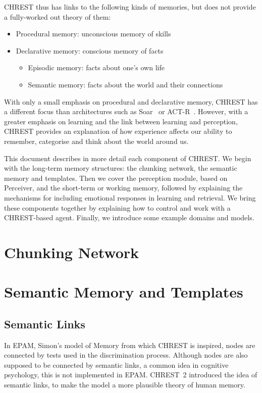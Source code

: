 \documentclass{article}
\begin{document}
CHREST thus has links to the following kinds of memories, but does not provide
a fully-worked out theory of them:

\begin{itemize}
\item Procedural memory: unconscious memory of skills
\item Declarative memory: conscious memory of facts
\begin{itemize}
\item Episodic memory: facts about one's own life
\item Semantic memory: facts about the world and their connections
\end{itemize}
\end{itemize}

With only a small emphasis on procedural and declarative memory, CHREST has a
different focus than architectures such as Soar~\cite{Laird12,Newell90} or
ACT-R~\cite{Anderson98}.  However, with a greater emphasis on learning and the 
link between learning and perception, CHREST provides an explanation of how 
experience affects our ability to remember, categorise and think about the 
world around us.

This document describes in more detail each component of CHREST.  We begin with
the long-term memory structures: the chunking network, the semantic memory and
templates.  Then we cover the perception module, based on Perceiver, and the
short-term or working memory, followed by explaining the mechanisms for
including emotional responses in learning and retrieval.  We bring these
components together by explaining how to control and work with a CHREST-based
agent.  Finally, we introduce some example domains and models.

\section{Chunking Network}


\section{Semantic Memory and Templates}

\subsection{Semantic Links}

In EPAM, Simon's model of Memory from which CHREST is inspired, nodes are
connected by tests used in the discrimination process.  Although nodes are also
supposed to be connected by semantic links, a common idea in cognitive
psychology, this is not implemented in EPAM.  CHREST~2 introduced the idea of
semantic links, to make the model a more plausible theory of human memory.
\end{document}
